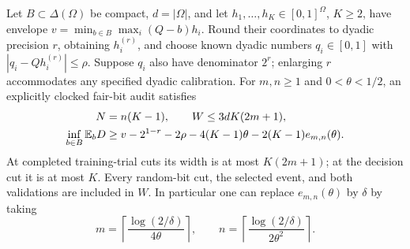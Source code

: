 \begin{theorem}
\label{thm:v22-tournament}
Let $B\subset\Delta(\Omega)$ be compact, $d=|\Omega|$, and let
$h_1,\ldots,h_K\in[0,1]^\Omega$, $K\ge2$, have envelope
$v=\min_{b\in B}\max_i(Q-b)h_i$. Round their coordinates to dyadic
precision $r$, obtaining $h_i^{(r)}$, and choose known dyadic numbers
$q_i\in[0,1]$ with $|q_i-Qh_i^{(r)}|\le\rho$. Suppose $q_i$ also have
denominator $2^r$; enlarging $r$ accommodates any specified dyadic
calibration. For $m,n\ge1$ and $0<\theta<1/2$, an explicitly clocked
fair-bit audit satisfies
\begin{align}
 N&=n(K-1),\qquad W\le3dK(2m+1),\label{eq:v22-tournament-resources}\\
 \inf_{b\in B}\mathbb E_bD
 &\ge v-2^{1-r}-2\rho-4(K-1)\theta
                 -2(K-1)e_{m,n}(\theta).\label{eq:v22-tournament-score}
\end{align}
At completed training-trial cuts its width is at most $K(2m+1)$;
at the decision cut it is at most $K$. Every random-bit cut, the
selected event, and both validations are included in $W$. In particular
one can replace $e_{m,n}(\theta)$ by $\delta$ by taking
\begin{equation}\label{eq:v22-polynomial}
 m=\left\lceil\frac{\log(2/\delta)}{4\theta}\right\rceil,
 \qquad
 n=\left\lceil\frac{\log(2/\delta)}{2\theta^2}\right\rceil.
\end{equation}
\end{theorem}
